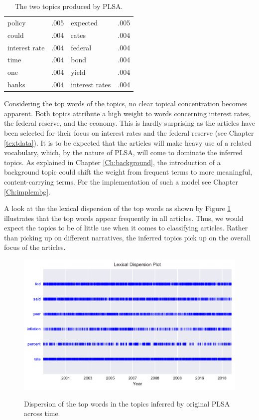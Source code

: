 \documentclass[11pt,a4paper,english,oneside]{book}
\numberwithin{equation}{chapter}
\begin{document}
\begin{table}[h]
\begin{tabular}{ p{3cm}  p{2cm}  p{3cm}  p{2cm} }
		policy			& .005 & expected		 & .005\\
		could			& .004 & rates			 & .004\\
		interest rate	& .004 & federal		 & .004\\
		time			& .004 & bond			 & .004\\
		one				& .004 & yield			 & .004\\
		banks			& .004 & interest rates  & .004\\
		\bottomrule %
	\end{tabular}
	\caption{The two topics produced by PLSA.} %
	\label{tab:topic1} %
\end{table}

Considering the top words of the topics, no clear topical concentration becomes apparent. Both topics attribute a high weight to words concerning interest rates, the federal reserve, and the economy. This is hardly surprising as the articles have been selected for their focus on interest rates and the federal reserve (see Chapter \ref{textdata}). It is to be expected that the articles will make heavy use of a related vocabulary, which, by the nature of PLSA, will come to dominate the inferred topics. As explained in Chapter \ref{Ch:background}, the introduction of a background topic could shift the weight from frequent terms to more meaningful, content-carrying terms. For the implementation of such a model see Chapter \ref{Ch:implembg}.

A look at the the lexical dispersion of the top words as shown by Figure \ref{dispersionPLSAorig} illustrates that the top words appear frequently in all articles. Thus, we would expect the topics to be of little use when it comes to classifying articles. Rather than picking up on different narratives, the inferred topics pick up on the overall focus of the articles. 

\begin{figure}
	\caption{Dispersion of the top words in the topics inferred by original PLSA across time.}
	\centering
	\includegraphics[scale=1]{Images/dispersionplot_topicPLSAorig.pdf}
	\label{dispersionPLSAorig}
\end{figure}
\end{document}
